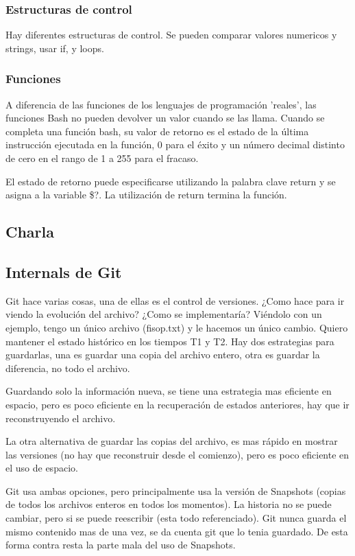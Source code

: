 \documentclass[titlepage,a4paper]{article}
\begin{document}
\subsubsection*{Estructuras de control}
Hay diferentes estructuras de control. Se pueden comparar valores numericos y strings, usar if, y loops.

\subsubsection*{Funciones}
A diferencia de las funciones de los lenguajes de programación 'reales', las funciones Bash no pueden devolver un valor cuando se las llama. Cuando se completa una función bash, su valor de retorno es el estado de la última instrucción ejecutada en la función, 0 para el éxito y un número decimal distinto de cero en el rango de 1 a 255 para el fracaso.

El estado de retorno puede especificarse utilizando la palabra clave return y se asigna a la variable \$?. La utilización de return termina la función.

\subsection*{Charla}
\subsection{Internals de Git}

Git hace varias cosas, una de ellas es el control de versiones. ¿Como hace para ir viendo la evolución del archivo? ¿Como se implementaría?
Viéndolo con un ejemplo, tengo un único archivo (fisop.txt) y le hacemos un único cambio. Quiero mantener el estado histórico en los tiempos T1 y T2. Hay dos estrategias para guardarlas, una es guardar una copia del archivo entero, otra es guardar la diferencia, no todo el archivo.

Guardando solo la información nueva, se tiene una estrategia mas eficiente en espacio, pero es poco eficiente en la recuperación de estados anteriores, hay que ir reconstruyendo el archivo.

La otra alternativa de guardar las copias del archivo, es mas rápido en mostrar las versiones (no hay que reconstruir desde el comienzo), pero es poco eficiente en el uso de espacio.

Git usa ambas opciones, pero principalmente usa la versión de Snapshots (copias de todos los archivos enteros en todos los momentos). La historia no se puede cambiar, pero si se puede reescribir (esta todo referenciado). Git nunca guarda el mismo contenido mas de una vez, se da cuenta git que lo tenia guardado. De esta forma contra resta la parte mala del uso de Snapshots.
\end{document}
